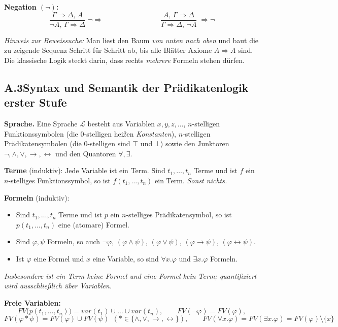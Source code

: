 \medskip
\noindent\textbf{Negation $(\neg)$:}
\[
\dfrac{\Gamma \Rightarrow \Delta,\,A}{\neg A,\,\Gamma \Rightarrow \Delta}\;\neg\Rightarrow
\qquad\qquad\qquad\qquad
\dfrac{A,\,\Gamma \Rightarrow \Delta}{\Gamma \Rightarrow \Delta,\,\neg A}\;\Rightarrow\neg
\]

\medskip
\noindent\textit{Hinweis zur Beweissuche:} Man liest den Baum \emph{von unten nach oben} und baut die zu zeigende Sequenz Schritt für Schritt ab, bis alle Blätter Axiome $A\Rightarrow A$ sind. Die klassische Logik steckt darin, dass rechts \emph{mehrere} Formeln stehen dürfen.

\newpage
\subsection*{A.3\quad Syntax und Semantik der Prädikatenlogik erster Stufe}

\noindent\textbf{Sprache.} Eine Sprache $\mathscr{L}$ besteht aus Variablen $x, y, z, \dots$, $n$-stelligen Funktionssymbolen (die $0$-stelligen heißen \emph{Konstanten}), $n$-stelligen Prädikatensymbolen (die $0$-stelligen sind $\top$ und $\bot$) sowie den Junktoren $\neg,\wedge,\vee,\to,\leftrightarrow$ und den Quantoren $\forall,\exists$.

\medskip
\noindent\textbf{Terme} (induktiv): Jede Variable ist ein Term. Sind $t_1,\dots,t_n$ Terme und ist $f$ ein $n$-stelliges Funktionssymbol, so ist $f(t_1,\dots,t_n)$ ein Term. \emph{Sonst nichts.}

\medskip
\noindent\textbf{Formeln} (induktiv):
\begin{itemize}
  \item Sind $t_1,\dots,t_n$ Terme und ist $p$ ein $n$-stelliges Prädikatensymbol, so ist $p(t_1,\dots,t_n)$ eine (atomare) Formel.
  \item Sind $\varphi,\psi$ Formeln, so auch $\neg\varphi$, $(\varphi\wedge\psi)$, $(\varphi\vee\psi)$, $(\varphi\to\psi)$, $(\varphi\leftrightarrow\psi)$.
  \item Ist $\varphi$ eine Formel und $x$ eine Variable, so sind $\forall x.\varphi$ und $\exists x.\varphi$ Formeln.
\end{itemize}
\emph{Insbesondere ist ein Term keine Formel und eine Formel kein Term; quantifiziert wird ausschließlich über Variablen.}

\medskip
\noindent\textbf{Freie Variablen:}
\[
  FV\big(p(t_1,\dots,t_n)\big)=var(t_1)\cup\dots\cup var(t_n),\qquad
  FV(\neg\varphi)=FV(\varphi),
\]
\[
  FV(\varphi\ast\psi)=FV(\varphi)\cup FV(\psi)\ \ (\ast\in\{\wedge,\vee,\to,\leftrightarrow\}),\qquad
  FV(\forall x.\varphi)=FV(\exists x.\varphi)=FV(\varphi)\setminus\{x\}
\]


